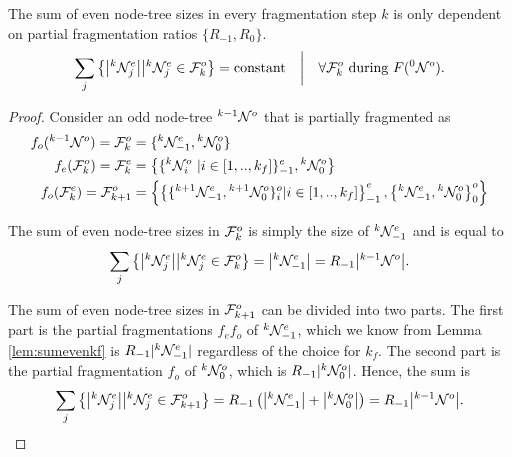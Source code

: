 \begin{lemma}\label{lem:equalevensum}
  The sum of even node-tree sizes in every fragmentation step $k$ is only dependent on partial fragmentation ratios $\{R_{-1}, R_0\}$. 
  \begin{equation}\label{eq:equalevensum}
    \sum_j{ \left\{ \abs{{}^{k}\mathcal{N}_j^e} \big| {}^{k}\mathcal{N}_j^e \in \mathcal{F}^o_k \right\} } = \text{constant}
  \hspace{1em} \bigg| \hspace{1em} \forall \mathcal{F}_k^o \text{ during } F({}^{0}\mathcal{N}^o).
  \end{equation}
\end{lemma}
\begin{proof}
  Consider an odd node-tree ${}^{k-1}\mathcal{N}^o$ that is partially fragmented as 
  \begin{align*}
    f_o({}^{k-1}\mathcal{N}^o) = \mathcal{F}^o_k      &= \{{}^{k}\mathcal{N}^e_{-1}, {}^{k}\mathcal{N}^o_0 \} \\
    f_e(\mathcal{F}^o_k)        = \mathcal{F}^e_k      &= \left\{ \{{}^{k}\mathcal{N}^o_i\ | i \in [1,..,k_f] \}^e_{-1}, {}^{k}\mathcal{N}^{o}_0 \right\}\\
    f_o(\mathcal{F}^e_k )       = \mathcal{F}^o_{k+1}  &= \left\{ \left\{ \{{}^{k+1}\mathcal{N}^e_{-1}, {}^{k+1}\mathcal{N}^o_0\}_i^o | i \in [1,..,k_f] \right\}^e_{-1}, \left\{{}^{k}\mathcal{N}^e_{-1}, {}^{k}\mathcal{N}^o_0 \right\}^{o}_0 \right\}
  \end{align*}

  The sum of even node-tree sizes in $\mathcal{F}^o_k$ is simply the size of ${}^{k}\mathcal{N}^e_{-1}$ and is equal to
  \begin{equation*}
    \sum_j{ \left\{ \abs{{}^{k}\mathcal{N}_j^e} \big| {}^{k}\mathcal{N}_j^e \in \mathcal{F}^o_k \right\} } = \abs{{}^{k}\mathcal{N}^e_{-1}} = R_{-1}\abs{{}^{k-1}\mathcal{N}^o}. 
  \end{equation*}

  The sum of even node-tree sizes in $\mathcal{F}^o_{k+1}$ can be divided into two parts. The first part is the partial fragmentations $f_e f_o$ of ${}^{k}\mathcal{N}^e_{-1}$, which we know from Lemma \ref{lem:sumevenkf} is $R_{-1}|{}^{k}\mathcal{N}^e_{-1}|$ regardless of the choice for $k_f$. The second part is the partial fragmentation $f_o$ of ${}^{k}\mathcal{N}^o_0$, which is $R_{-1}|{}^{k}\mathcal{N}^o_0|$. Hence, the sum is
  \begin{equation*}
    \sum_j{ \left\{ \abs{{}^{k}\mathcal{N}_j^e} \big| {}^{k}\mathcal{N}_j^e \in \mathcal{F}^o_{k+1} \right\} } = R_{-1} \left( \abs{{}^{k}\mathcal{N}^e_{-1}} + \abs{{}^{k}\mathcal{N}^o_0} \right) = R_{-1}\abs{{}^{k-1}\mathcal{N}^o}. 
  \end{equation*}
\end{proof}

